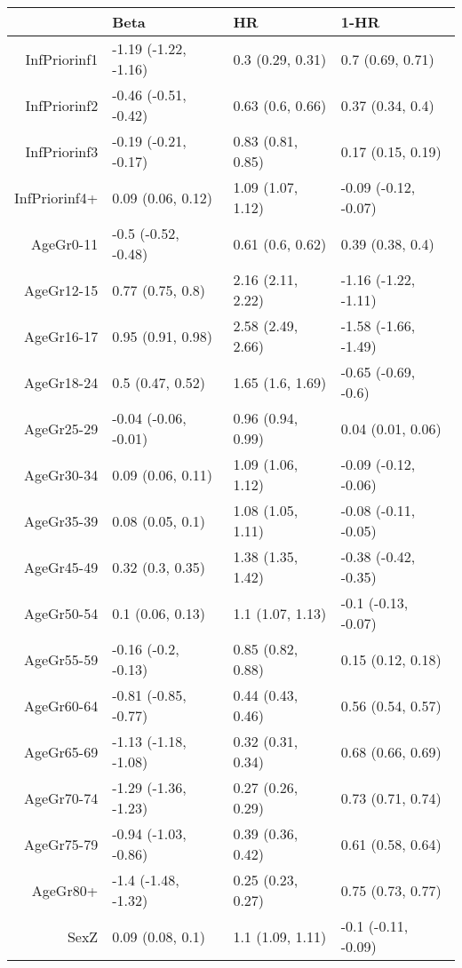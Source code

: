 \begin{table}[ht]
\centering
\begin{tabular}{rlll}
  \hline
 & Beta & HR & 1-HR \\ 
  \hline
InfPriorinf1 & -1.19 (-1.22, -1.16) & 0.3 (0.29, 0.31) & 0.7 (0.69, 0.71) \\ 
  InfPriorinf2 & -0.46 (-0.51, -0.42) & 0.63 (0.6, 0.66) & 0.37 (0.34, 0.4) \\ 
  InfPriorinf3 & -0.19 (-0.21, -0.17) & 0.83 (0.81, 0.85) & 0.17 (0.15, 0.19) \\ 
  InfPriorinf4+ & 0.09 (0.06, 0.12) & 1.09 (1.07, 1.12) & -0.09 (-0.12, -0.07) \\ 
  AgeGr0-11 & -0.5 (-0.52, -0.48) & 0.61 (0.6, 0.62) & 0.39 (0.38, 0.4) \\ 
  AgeGr12-15 & 0.77 (0.75, 0.8) & 2.16 (2.11, 2.22) & -1.16 (-1.22, -1.11) \\ 
  AgeGr16-17 & 0.95 (0.91, 0.98) & 2.58 (2.49, 2.66) & -1.58 (-1.66, -1.49) \\ 
  AgeGr18-24 & 0.5 (0.47, 0.52) & 1.65 (1.6, 1.69) & -0.65 (-0.69, -0.6) \\ 
  AgeGr25-29 & -0.04 (-0.06, -0.01) & 0.96 (0.94, 0.99) & 0.04 (0.01, 0.06) \\ 
  AgeGr30-34 & 0.09 (0.06, 0.11) & 1.09 (1.06, 1.12) & -0.09 (-0.12, -0.06) \\ 
  AgeGr35-39 & 0.08 (0.05, 0.1) & 1.08 (1.05, 1.11) & -0.08 (-0.11, -0.05) \\ 
  AgeGr45-49 & 0.32 (0.3, 0.35) & 1.38 (1.35, 1.42) & -0.38 (-0.42, -0.35) \\ 
  AgeGr50-54 & 0.1 (0.06, 0.13) & 1.1 (1.07, 1.13) & -0.1 (-0.13, -0.07) \\ 
  AgeGr55-59 & -0.16 (-0.2, -0.13) & 0.85 (0.82, 0.88) & 0.15 (0.12, 0.18) \\ 
  AgeGr60-64 & -0.81 (-0.85, -0.77) & 0.44 (0.43, 0.46) & 0.56 (0.54, 0.57) \\ 
  AgeGr65-69 & -1.13 (-1.18, -1.08) & 0.32 (0.31, 0.34) & 0.68 (0.66, 0.69) \\ 
  AgeGr70-74 & -1.29 (-1.36, -1.23) & 0.27 (0.26, 0.29) & 0.73 (0.71, 0.74) \\ 
  AgeGr75-79 & -0.94 (-1.03, -0.86) & 0.39 (0.36, 0.42) & 0.61 (0.58, 0.64) \\ 
  AgeGr80+ & -1.4 (-1.48, -1.32) & 0.25 (0.23, 0.27) & 0.75 (0.73, 0.77) \\ 
  SexZ & 0.09 (0.08, 0.1) & 1.1 (1.09, 1.11) & -0.1 (-0.11, -0.09) \\ 
   \hline
\end{tabular}
\end{table}
